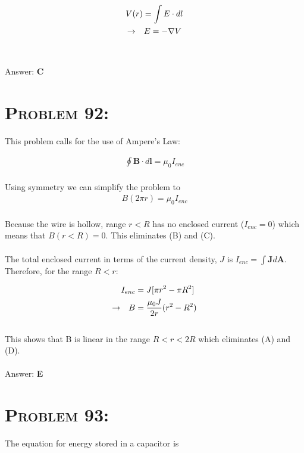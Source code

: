 \documentclass{article}
\begin{document}
\begin{gather}
V(r) = \int E \cdot dl \nonumber\\
\rightarrow \hspace{.1in} E = - \nabla V \nonumber
\end{gather}
\\\\
Answer: \textbf{\textcolor{ProcessBlue}C}\\


\section{\textsc{Problem 92:}} This problem calls for the use of Ampere's Law:

\begin{align}
\oint \textbf{B} \cdot d \textbf{l} = \mu_{0} I_{enc}
\end{align}
\\
Using symmetry we can simplify the problem to
\begin{align}
B (2 \pi r)  = \mu_{0} I_{enc}\nonumber
\end{align}
\\
Because the wire is hollow, range $r < R$ has no enclosed current ($I_{enc} = 0$) which means that $B(r < R) = 0$. This eliminates (B) and (C). \\\\The total enclosed current in terms of the current density, $J$ is $I_{enc} = \int \textbf{J} d \textbf{A}$. Therefore, for the range $R < r $:

\begin{align}
I_{enc} &= J [\pi r^{2} - \pi R^{2}]\nonumber\\
\rightarrow \hspace{.1in} B &= \frac{\mu_{0} J}{2r} (r^{2} - R^{2})\nonumber
\end{align}
\\
This shows that B is linear in the range $R < r < 2R$ which eliminates (A) and (D).
\\\\
Answer: \textbf{\textcolor{ProcessBlue}E}\\


\section{\textsc{Problem 93:}} The equation for energy stored in a capacitor is
\end{document}
